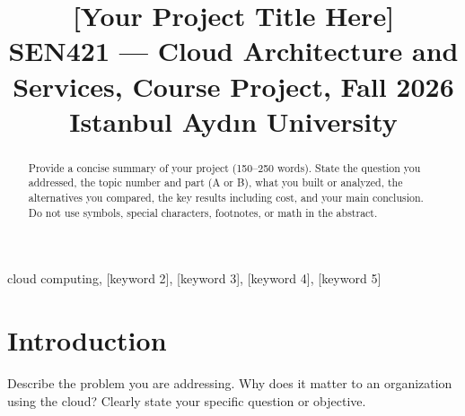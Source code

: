 \documentclass[conference,a4paper]{IEEEtran}
\begin{document}
	
	\title{[Your Project Title Here]\\
		{\footnotesize SEN421 --- Cloud Architecture and Services, Course Project, Fall 2026\\
			Istanbul Ayd\i n University}
	}
	
	\author{
	}
	
	\maketitle
	
	\begin{abstract}
		Provide a concise summary of your project (150--250 words). State the question you addressed, the topic number and part (A or B), what you built or analyzed, the alternatives you compared, the key results including cost, and your main conclusion. Do not use symbols, special characters, footnotes, or math in the abstract.
	\end{abstract}
	
	\begin{IEEEkeywords}
		cloud computing, [keyword 2], [keyword 3], [keyword 4], [keyword 5]
	\end{IEEEkeywords}
	
	\begin{center}
	\end{center}
	
	\section{Introduction}
	\label{sec:introduction}
	
	Describe the problem you are addressing. Why does it matter to an organization using the cloud? Clearly state your specific question or objective.
	
\end{document}
